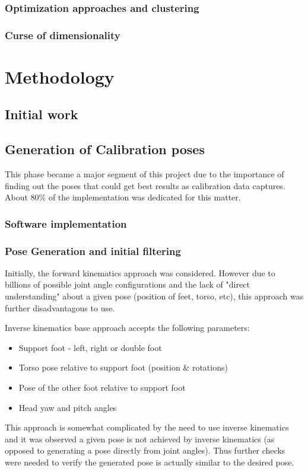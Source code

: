 \documentclass[english, printversion, nomenclature, notitle]{tuvisionthesis} %
\begin{document}
\subsection{Optimization approaches and clustering}
\subsection{Curse of dimensionality}

\chapter{Methodology}

\section{Initial work}
\section{Generation of Calibration poses}
This phase became a major segment of this project due to the importance of finding out the poses that could get best results as calibration data captures. About 80\% of the implementation was dedicated for this matter.

\subsection{Software implementation}
\subsection{Pose Generation and initial filtering}

Initially, the forward kinematics approach was considered. However due to billions of possible joint angle configurations and the lack of "direct understanding" about a given pose (position of feet, torso, etc), this approach was further disadvantagous to use.

Inverse kinematics base approach accepts the following parameters:
\begin{itemize}
	\item Support foot - left, right or double foot
	\item Torso pose relative to support foot (position \& rotations)
	\item Pose of the other foot relative to support foot
	\item Head yaw and pitch angles
\end{itemize}
This approach is somewhat complicated by the need to use inverse kinematics and it was observed a given pose is not achieved by inverse kinematics (as opposed to generating a pose directly from joint angles). Thus further checks were needed to verify the generated pose is actually similar to the desired pose.
\end{document}
